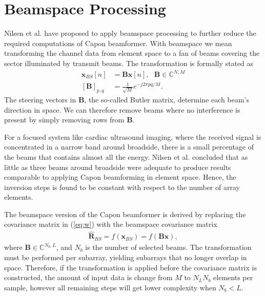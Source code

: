 \documentclass[12pt,journal,onecolumn]{IEEEtran}
\newcommand{\mat}[1]{\mathbf{#1}}
\renewcommand{\vec}[1]{\mathbf{#1}}
\begin{document}
\section{Beamspace Processing}\label{sec:bs}
Nilsen et al. \cite{Nilsen2009} have proposed to apply beamspace processing to further reduce the required computations of Capon beamformer. With beamspace we mean transforming the channel data from element space to a fan of beams covering the sector illuminated by transmit beams. The transformation is formally stated as
\begin{align}
\vec{x}_{BS}[n] &= \mat{B}\vec{x}[n], \ \ \ \mat{B} \in \mathbb{C}^{N,M}\\
[\mat{B}]_{p,q} &= \frac{1}{\sqrt{M}}e^{-j 2 \pi p q / M}.
\end{align} 
The steering vectors in $\mat{B}$, the so-called Butler matrix, determine each beam's direction in space. We can therefore remove beams where no interference is present by simply removing rows from $\mat{B}$. 

For a focused system like cardiac ultrasound imaging, where the received signal is concentrated in a narrow band around broadside, there is a small percentage of the beams that contains almost all the energy. Nilsen et al. concluded that as little as three beams around broadside were adequate to produce results comparable to applying Capon beamforming in element space. Hence, the inversion steps is found to be constant with respect to the number of array elements.

The beamspace version of the Capon beamformer is derived by replacing the covariance matrix in (\ref{eq:w}) with the beamspace covariance matrix 
\begin{align}
\mat{\hat{R}}_{BS} = f(\vec{x}_{BS}) = f(\mat{B}\vec{x}), 
\end{align}
where $\mat{B} \in \mathbb{C}^{N_b,L}$, and $N_b$ is the number of selected beams. The transformation must be performed per subarray, yielding subarrays that no longer overlap in space. Therefore, if the transformation is applied before the covariance matrix is constructed, the amount of input data is change from $M$ to $N_LN_b$ elements per sample, however all remaining steps will get lower complexity when $N_b < L$.
\end{document}
